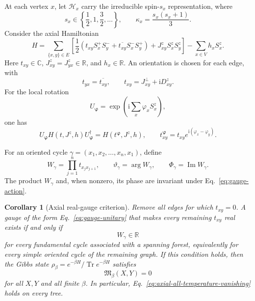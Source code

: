 \documentclass[aps,prb,preprint,nofootinbib,longbibliography]{revtex4-2}
\newcommand{\Tr}{\operatorname{Tr}}
\newcommand{\Mmod}{\mathfrak{M}}
\newcommand{\ii}{\mathrm{i}}
\newtheorem{corollary}[theorem]{Corollary}
\begin{document}
At each vertex $x$, let $\mathcal H_x$ carry the irreducible spin-$s_x$
representation, where
\begin{equation}
 s_x\in\left\{\frac12,1,\frac32,\ldots\right\},
 \qquad
 \kappa_x=\frac{s_x(s_x+1)}3.
 \label{eq:kappa-definition}
\end{equation}
Consider the axial Hamiltonian
\begin{equation}
 H=\sum_{\{x,y\}\in E}
 \left[
 \frac12\left(
 t_{xy}S_x^+S_y^-+\overline{t_{xy}}S_x^-S_y^+
 \right)
 +J_{xy}^zS_x^zS_y^z
 \right]
 -\sum_{x\in V}h_xS_x^z.
 \label{eq:axial-H}
\end{equation}
Here $t_{xy}\in\mathbb C$, $J_{xy}^z=J_{yx}^z\in\mathbb R$, and
$h_x\in\mathbb R$.  An orientation is chosen for each edge, with
\begin{equation}
 t_{yx}=\overline{t_{xy}},
 \qquad
 t_{xy}=J_{xy}^{\perp}+\ii D_{xy}^z.
 \label{eq:t-definition}
\end{equation}
For the local rotation
\begin{equation}
 U_{\bm\varphi}
 =\exp\left(\ii\sum_x\varphi_xS_x^z\right),
 \label{eq:gauge-unitary}
\end{equation}
one has
\begin{equation}
 U_{\bm\varphi}H(t,J^z,h)U_{\bm\varphi}^\dagger
 =H(t^{\bm\varphi},J^z,h),
 \qquad
 t_{xy}^{\bm\varphi}
 =t_{xy}e^{\ii(\varphi_x-\varphi_y)}.
 \label{eq:gauge-action}
\end{equation}

For an oriented cycle
\(
\gamma=(x_1,x_2,\ldots,x_n,x_1)
\), define
\begin{equation}
 W_\gamma
 =\prod_{j=1}^nt_{x_jx_{j+1}},
 \qquad
 \vartheta_\gamma=\arg W_\gamma,
 \qquad
 \Phi_\gamma=\operatorname{Im}W_\gamma.
 \label{eq:Wilson-definitions}
\end{equation}
The product $W_\gamma$ and, when nonzero, its phase are invariant under
Eq.~\eqref{eq:gauge-action}.

\begin{corollary}[Axial real-gauge criterion]
\label{cor:real-gauge}
Remove all edges for which $t_{xy}=0$.  A gauge of the form
Eq.~\eqref{eq:gauge-unitary} that makes every remaining $t_{xy}$ real exists
if and only if
\begin{equation}
 W_\gamma\in\mathbb R
 \label{eq:real-Wilson-products}
\end{equation}
for every fundamental cycle associated with a spanning forest, equivalently
for every simple oriented cycle of the remaining graph.  If this condition holds,
then the Gibbs state $\rho_\beta=e^{-\beta H}/\Tr e^{-\beta H}$ satisfies
\begin{equation}
 \Mmod_\beta(X,Y)=0
 \label{eq:axial-all-temperature-vanishing}
\end{equation}
for all $X,Y$ and all finite $\beta$.  In particular,
Eq.~\eqref{eq:axial-all-temperature-vanishing} holds on every tree.
\end{corollary}
\end{document}
